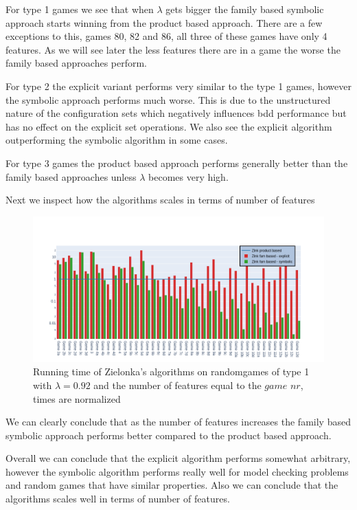 For type 1 games we see that when $\lambda$ gets bigger the family based symbolic approach starts winning from the product based approach. There are a few exceptions to this, games 80, 82 and 86, all three of these games have only 4 features. As we will see later the less features there are in a game the worse the family based approaches perform.

For type 2 the explicit variant performs very similar to the type 1 games, however the symbolic approach performs much worse. This is due to the unstructured nature of the configuration sets which negatively influences bdd performance but has no effect on the explicit set operations. We also see the explicit algorithm outperforming the symbolic algorithm in some cases.

For type 3 games the product based approach performs generally better than the family based approaches unless $\lambda$ becomes very high.

Next we inspect how the algorithms scales in terms of number of features
\begin{figure}[H]
\includegraphics[width=1\linewidth]{"results/randomscalegames/Zlnk product based_Zlnk fam based - explicit_Zlnk fam based - symbolic_"}
\caption{Running time of Zielonka's algorithms on randomgames of type 1 with $\lambda = 0.92$ and the number of features equal to the $\textit{game nr}$, times are normalized}
\label{fig:elevatorzlnks}
\end{figure}%
We can clearly conclude that as the number of features increases the family based symbolic approach performs better compared to the product based approach.

Overall we can conclude that the explicit algorithm performs somewhat arbitrary, however the symbolic algorithm performs really well for model checking problems and random games that have similar properties. Also we can conclude that the algorithms scales well in terms of number of features.


